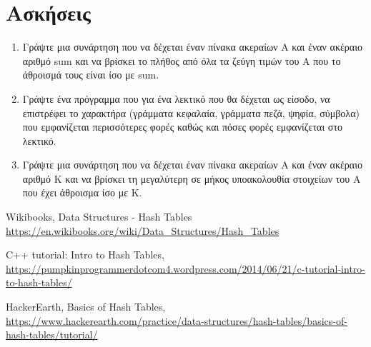 



\section{Ασκήσεις}
\begin{enumerate}
\item Γράψτε μια συνάρτηση που να δέχεται έναν πίνακα ακεραίων Α και έναν ακέραιο αριθμό sum και να βρίσκει το πλήθος από όλα τα ζεύγη τιμών του Α που το άθροισμά τους είναι ίσο με sum.
\item Γράψτε ένα πρόγραμμα που για ένα λεκτικό που θα δέχεται ως είσοδο, να επιστρέφει το χαρακτήρα (γράμματα κεφαλαία, γράμματα πεζά, ψηφία, σύμβολα) που εμφανίζεται περισσότερες φορές καθώς και πόσες φορές εμφανίζεται στο λεκτικό.
\item Γράψτε μια συνάρτηση που να δέχεται έναν πίνακα ακεραίων Α και έναν ακέραιο αριθμό Κ και να βρίσκει τη μεγαλύτερη σε μήκος υποακολουθία στοιχείων του Α που έχει άθροισμα ίσο με Κ.
\end{enumerate}

\begin{thebibliography}{9}
Wikibooks, Data Structures - Hash Tables \href{https://en.wikibooks.org/wiki/Data_Structures/Hash_Tables}{https://en.wikibooks.org/wiki/Data\_Structures/Hash\_Tables}

C++ tutorial: Intro to Hash Tables,
\href{https://pumpkinprogrammerdotcom4.wordpress.com/2014/06/21/c-tutorial-intro-to-hash-tables/}{https://pumpkinprogrammerdotcom4.wordpress.com/2014/06/21/c-tutorial-intro-to-hash-tables/}

HackerEarth, Basics of Hash Tables, \href{https://www.hackerearth.com/practice/data-structures/hash-tables/basics-of-hash-tables/tutorial/}{https://www.hackerearth.com/practice/data-structures/hash-tables/basics-of-hash-tables/tutorial/}

\end{thebibliography}


